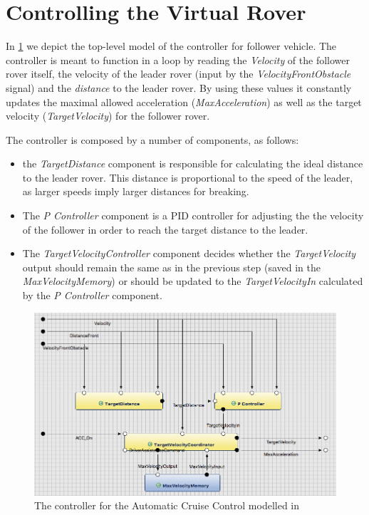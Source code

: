 \section{Controlling the Virtual Rover}

In \fig\ref{fig:acc_model} we depict the top-level model of the controller for
follower vehicle. The controller is meant to function in a loop by reading the
\emph{Velocity} of the follower rover itself, the velocity of the leader rover
(input by the \emph{VelocityFrontObstacle} signal) and the \emph{distance} to
the leader rover. By using these values it constantly updates the maximal
allowed acceleration (\emph{MaxAcceleration}) as well as
the target velocity (\emph{TargetVelocity}) for the follower rover.

The controller is composed by a number of \af components, as follows:
\begin{itemize}
  \item the \emph{TargetDistance} component is responsible for calculating the ideal
distance to the leader rover. This distance is proportional to the speed of
the leader, as larger speeds imply larger distances for breaking. 
  \item The \emph{P Controller} component is a PID controller for adjusting the
the velocity of the follower in order to reach the target distance to the
leader.
\item The \emph{TargetVelocityController} component decides whether the
\emph{TargetVelocity} output should remain the same as in the previous step
(saved in the \emph{MaxVelocityMemory}) or should be updated to the
\emph{TargetVelocityIn} calculated by the \emph{P Controller} component.
\end{itemize}


\begin{figure}[!h]
\centering
\includegraphics[width=1\textwidth]{images/ACC_controller_model.png}
\caption{The controller for the Automatic Cruise Control modelled in \af}
\label{fig:acc_model}
\end{figure}

